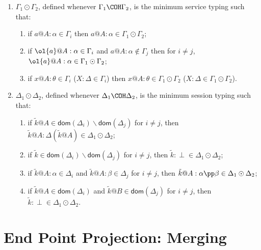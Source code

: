 \begin{enumerate}
  \item $\Gamma_1\odot\Gamma_2$, defined whenever
    $\Gamma_1\COH\Gamma_2$, is the minimum service typing such that:
    \begin{enumerate}
    \item if ${a}@A:\alpha\in\Gamma_{i}$ %
      then ${a}@A:\alpha\in \Gamma_1\odot\Gamma_2$;
    \item if $\ol{a}@A:\alpha\in\Gamma_{i}$ and
      ${a}@A:\alpha\not\in\Gamma_{j}$ then for $i \neq j$,
      $\ol{a}@A:\alpha\in \Gamma_1\odot\Gamma_2$;
    \item if $x@A:\theta\in\Gamma_i$ ($X:\Delta\in\Gamma_i$) then
      $x@A:\theta\in\Gamma_1\odot\Gamma_2$
      ($X:\Delta\in\Gamma_1\odot\Gamma_2$).
    \end{enumerate}


  \item $\Delta_1\odot\Delta_2$, defined whenever
    $\Delta_1\COH\Delta_2$, is the minimum session typing such that:
    \begin{enumerate}
    \item if $\tilde
      k@A\in\mathsf{dom}(\Delta_i)\backslash\mathsf{dom}(\Delta_{j})$
      for $i \neq j$, then $\tilde k@A:\Delta(\tilde
      k@A)\in\Delta_1\odot\Delta_2$;
    \item if $\tilde
      k\in\mathsf{dom}(\Delta_i)\backslash\mathsf{dom}(\Delta_{j})$ for $i \neq j$,
      then $\tilde k:\perp\in\Delta_1\odot\Delta_2$;
    \item if $\tilde k@A:\alpha\in\Delta_i$ and $\tilde
      k@A:\beta\in\Delta_{j}$ for $i \neq j$, then $\tilde
      k@A:\alpha\pp\beta\in\Delta_1\odot\Delta_2$;

    \item if $\tilde k@A\in\mathsf{dom}(\Delta_i)$ and $\tilde
      k@B\in\mathsf{dom}(\Delta_{j})$ for $i \neq j$, then $\tilde
      k:\perp\in\Delta_1\odot \Delta_2$.
    \end{enumerate}
  \end{enumerate}




\section{End Point Projection: Merging}
\label{Logic4Struct:appendix:EPP-merging}


